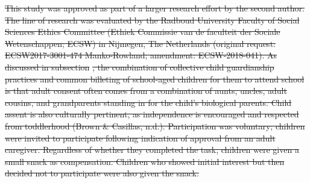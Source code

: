 \documentclass[ %
american, %
,man,floatsintext]{apa6} %
\providecommand{\DIFdeltex}[1]{{\protect\color{red}\sout{#1}}}                      %
\providecommand{\DIFdelbegin}{} %
\providecommand{\DIFdel}[1]{\texorpdfstring{\DIFdeltex{#1}}{}} %
\newcommand{\DIFscaledelfig}{0.5}
\newlength{\DIFdelgraphicswidth} %
\newlength{\DIFdelgraphicsheight} %
\newcommand{\DIFdelincludegraphics}[2][]{%
	\sbox{\DIFdelgraphicsbox}{\DIFOincludegraphics[#1]{#2}}%
	\settoboxwidth{\DIFdelgraphicswidth}{\DIFdelgraphicsbox} %
	\settoboxtotalheight{\DIFdelgraphicsheight}{\DIFdelgraphicsbox} %
	\scalebox{\DIFscaledelfig}{%
		\parbox[b]{\DIFdelgraphicswidth}{\usebox{\DIFdelgraphicsbox}\\[-\baselineskip] \rule{\DIFdelgraphicswidth}{0em}}\llap{\resizebox{\DIFdelgraphicswidth}{\DIFdelgraphicsheight}{%
				\setlength{\unitlength}{\DIFdelgraphicswidth}%
				\begin{picture}(1,1)%
				\thicklines\linethickness{2pt} %
				{\color[rgb]{1,0,0}\put(0,0){\framebox(1,1){}}}%
				{\color[rgb]{1,0,0}\put(0,0){\line( 1,1){1}}}%
				{\color[rgb]{1,0,0}\put(0,1){\line(1,-1){1}}}%
				\end{picture}%
			}\hspace*{3pt}}} %
} %
\DeclareRobustCommand{\DIFdelbegin}{\DIFOdelbegin \let\includegraphics\DIFdelincludegraphics} %
\begin{document}
\DIFdelbegin %

\DIFdel{This study was approved as part of a larger research effort by the second author. The line of research was evaluated by the Radboud University Faculty of Social Sciences Ethics Committee (Ethiek Commissie van de faculteit der Sociale Wetenschappen; ECSW) in Nijmegen, The Netherlands (original request: ECSW2017-3001-474 Manko-Rowland; amendment: ECSW-2018-041). As discussed in subsection }%
\DIFdel{, the combination of collective child guardianship practices and common billeting of school-aged children for them to attend school is that adult consent often comes from a combination of aunts, uncles, adult cousins, and grandparents standing in for the child's biological parents. Child assent is also culturally pertinent, as independence is encouraged and respected from toddlerhood (Brown \& Casillas, n.d.). Participation was voluntary; children were invited to participate following indication of approval from an adult caregiver. Regardless of whether they completed the task, children were given a small snack as compensation. Children who showed initial interest but then decided not to participate were also given the snack.
}%
\end{document}
